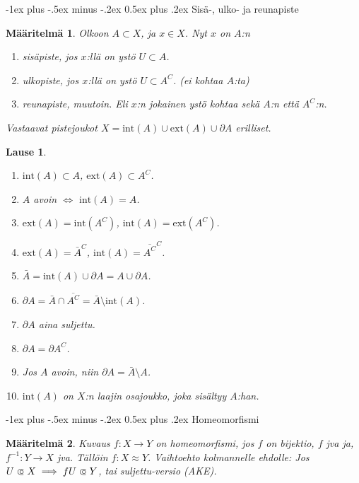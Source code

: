 \documentclass[landscape,a4paper,9pt]{extarticle}
\makeatletter
\renewcommand{\section}{\@startsection{section}{1}{0mm}%
                                {-1ex plus -.5ex minus -.2ex}%
                                {0.5ex plus .2ex}%
                                {\color{blue}\normalfont\large\bfseries}}
\newcommand\opn{\mathrel{\ooalign{$\subset$\cr
  \hidewidth\hbox{$\circ\mkern.5mu$}\cr}}}
\theoremstyle{customtheoremstyle}
\newtheorem*{theorem}{Lause}
\newtheorem*{definition}{Määritelmä}
\makeatother
\begin{document}
\begin{multicols*}{3}
\section{Sisä-, ulko- ja reunapiste}
\begin{definition}
  Olkoon $A \subset X$, ja $x \in X$. Nyt $x$ on $A$:n
  \begin{enumerate}
    \item{sisäpiste, jos $x$:llä on ystö $U \subset A$.}
    \item{ulkopiste, jos $x$:llä on ystö $U \subset A^C$. (ei kohtaa $A$:ta)}
    \item{reunapiste, muutoin. Eli $x$:n jokainen ystö kohtaa sekä $A$:n että
      $A^C$:n.}
  \end{enumerate}
  Vastaavat pistejoukot $X = \text{int}(A) \cup \text{ext}(A) \cup \partial A$
  erilliset.
\end{definition}


\begin{theorem}
  \begin{enumerate}
    \item{$\text{int}(A) \subset A$, $\text{ext}(A) \subset A^C$.}
    \item{$A$ avoin $\iff$ $\text{int}(A) = A$.}
    \item{$\text{ext}(A) = \text{int}(A^C)$, $\text{int}(A) = \text{ext}(A^C)$.}
    \item{$\text{ext}(A) = \bar{A}^C$,
      $\text{int}(A) = \overline{A^C}^C$.}
    \item{$\bar{A} = \text{int}(A) \cup \partial A = A \cup \partial A$.}
    \item{$\partial A = \bar{A} \cap \overline{A^C} =
      \bar{A} \setminus \text{int}(A)$.}
    \item{$\partial A$ aina suljettu.}
    \item{$\partial A = \partial A^C$.}
    \item{Jos $A$ avoin, niin $\partial A = \bar{A} \setminus A$.}
    \item{$\text{int}(A)$ on $X$:n laajin osajoukko, joka sisältyy $A$:han.}
  \end{enumerate}
\end{theorem}


\section{Homeomorfismi}
\begin{definition}
  Kuvaus $f: X \rightarrow Y$ on homeomorfismi, jos $f$ on bijektio, $f$ jva
  ja, $f^{-1}: Y \rightarrow X$ jva. Tällöin $f: X \approx Y$.
  Vaihtoehto kolmannelle ehdolle: Jos $U \opn X \implies f U \opn Y$, tai
  suljettu-versio (AKE).
\end{definition}


\end{multicols*}
\end{document}
